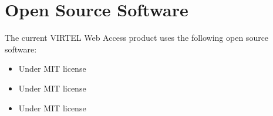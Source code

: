 \documentclass[letterpaper,10pt,english]{sphinxmanual}
\begin{document}
\section{Open Source Software}
\label{\detokenize{Getting_Started:open-source-software}}
\sphinxAtStartPar
The current VIRTEL Web Access product uses the following open source software:
\begin{itemize}
\item {} \begin{description}
\sphinxAtStartPar
Under MIT license \sphinxhyphen{} 

\end{description}

\item {} \begin{description}
\sphinxAtStartPar
Under MIT license \sphinxhyphen{} 

\end{description}

\item {} \begin{description}
\sphinxAtStartPar
Under MIT license \sphinxhyphen{} 

\end{description}

\end{itemize}



\renewcommand{\indexname}{Index}
\printindex
\end{document}
